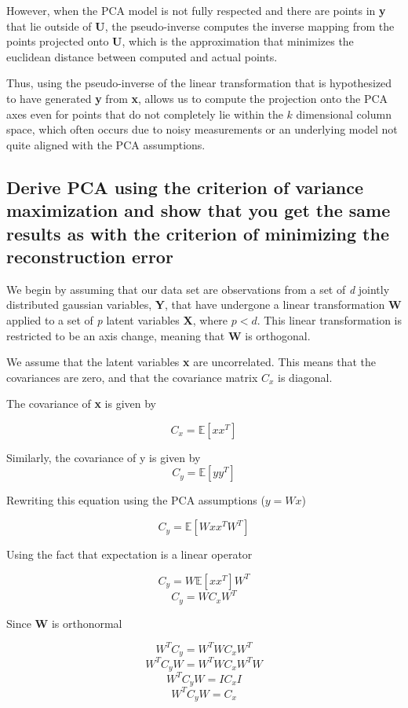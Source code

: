 \documentclass[11pt,a4paper,landscape]{article}
\begin{document}
However, when the PCA model is not fully respected and there are points in \textbf{y} that lie outside of \textbf{U}, the pseudo-inverse computes the inverse mapping from the points projected onto \textbf{U}, which is the approximation that minimizes the euclidean distance between computed and actual points\cite{pseudoinverse}.\newline

Thus, using the pseudo-inverse of the linear transformation that is hypothesized to have generated \textbf{y} from \textbf{x}, allows us to compute the projection onto the PCA axes even for points that do not completely lie within the $k$ dimensional column space, which often occurs due to noisy measurements or an underlying model not quite aligned with the PCA assumptions.

\subsection{Derive PCA using the criterion of variance maximization and show that you get the same results as with the criterion of minimizing the reconstruction error}

We begin by assuming that our data set are observations from a set of \textit{d} jointly distributed gaussian variables, \textbf{Y}, that have undergone a linear transformation \textbf{W} applied to a set of \textit{p} latent variables \textbf{X}, where $p < d$. This linear transformation is restricted to be an axis change, meaning that \textbf{W} is orthogonal.\newline

We assume that the latent variables \textbf{x} are uncorrelated. This means that the covariances are zero, and that the covariance matrix $C_{x} $ is diagonal.

The covariance of \textbf{x} is given by

$$ C_{x} = \mathbb{E}[xx^{T}] $$

Similarly, the covariance of y is given by 
$$ C_{y} = \mathbb{E}[yy^{T}] $$

Rewriting this equation using the PCA assumptions ($y = Wx$)

$$ C_{y} = \mathbb{E}[Wxx^{T}W^{T}] $$

Using the fact that expectation is a linear operator

$$ C_{y} = W\mathbb{E}[xx^{T}]W^{T}$$
$$ C_{y} = WC_{x}W^{T}$$

Since \textbf{W} is orthonormal

$$ W^{T}C_{y} = W^{T}WC_{x}W^{T}$$
$$ W^{T}C_{y}W = W^{T}WC_{x}W^{T}W$$
$$ W^{T}C_{y}W = IC_{x}I$$
$$ W^{T}C_{y}W = C_{x}$$
\end{document}
